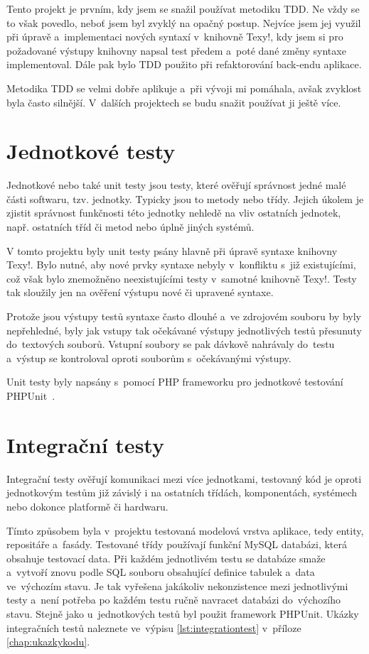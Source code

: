 \documentclass[11pt,twoside,a4paper]{book}
\begin{document}
Tento projekt je prvním, kdy jsem se snažil používat metodiku TDD. Ne vždy se to však povedlo, neboť jsem byl zvyklý na opačný postup. Nejvíce jsem jej využil při úpravě a~imple\-mentaci nových syntaxí v~knihovně Texy!, kdy jsem si pro požadované výstupy knihovny napsal test předem a~poté dané změny syntaxe imple\-mentoval. Dále pak bylo TDD použito při refaktorování back-endu aplikace.

Metodika TDD se velmi dobře aplikuje a~při vývoji mi pomáhala, avšak zvyklost byla často silnější. V~dalších projektech se budu snažit používat ji ještě více.


\section{Jednotkové testy}
Jednotkové nebo také unit testy jsou testy, které ověřují správnost jedné malé části softwaru, tzv. jednotky. Typicky jsou to metody nebo třídy. Jejich úkolem je zjistit správnost funkčnosti této jednotky nehledě na vliv ostatních jednotek, např. ostatních tříd či metod nebo úplně jiných systémů.

V tomto projektu byly unit testy psány hlavně při úpravě syntaxe knihovny Texy!. Bylo nutné, aby nové prvky syntaxe nebyly v~konfliktu s~již existujícími, což však bylo znemožněno neexistujícími testy v~samotné knihovně Texy!. Testy tak sloužily jen na ověření výstupu nové či upravené syntaxe.

Protože jsou výstupy testů syntaxe často dlouhé a~ve zdrojovém souboru by byly nepřehledné, byly jak vstupy tak očekávané výstupy jednotlivých testů přesunuty do~textových souborů. Vstupní soubory se pak dávkově nahrávaly do~testu a~výstup se kontroloval oproti souborům s~očekávanými výstupy.

Unit testy byly napsány s~pomocí PHP frameworku pro jednotkové testování PHPUnit~\cite{phpunit}.


\section{Integrační testy}
Integrační testy ověřují komunikaci mezi více jednotkami, testovaný kód je oproti jednotkovým testům již závislý i na ostatních třídách, komponentách, systémech nebo dokonce platformě či hardwaru.

Tímto způsobem byla v~projektu testovaná modelová vrstva aplikace, tedy entity, repositáře a~fasády. Testované třídy používají funkční MySQL databázi, která obsahuje testovací data. Při každém jednotlivém testu se databáze smaže a~vytvoří znovu podle SQL souboru obsahující definice tabulek a~data ve~výchozím stavu. Je tak vyřešena jakákoliv nekonzistence mezi jednotlivými testy a~není potřeba po každém testu ručně navracet databázi do~výchozího stavu. Stejně jako u~jednotkových testů byl použit framework PHPUnit. Ukázky integračních testů naleznete ve~výpisu \ref{lst:integrationtest} v~příloze \ref{chap:ukazkykodu}.
\end{document}

